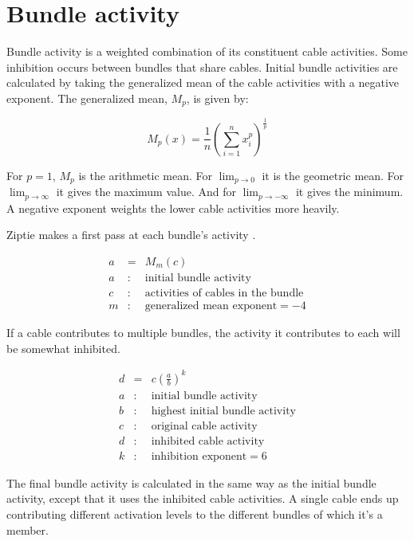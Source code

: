 \documentclass[oneside,twocolumn]{article}
\begin{document}
\section*{\color{copper} Bundle activity}

Bundle activity is a weighted combination of its constituent cable activities. Some inhibition occurs between bundles that share cables. Initial bundle activities are calculated by taking the generalized mean of the cable activities with a negative exponent.  
The generalized mean, $M_p$, is given by:

\begin{equation*}
M_p(x) = {\frac{1}{n}\left( \sum_{i=1}^{n}x_i^p  \right)}^{\frac{1}{p}} 
\end{equation*}

For $p = 1$, $M_p$ is the arithmetic mean. For $\lim_{p \to 0}$ it is the geometric mean. For $\lim_{p \to \infty}$ it gives the maximum value. And for   $\lim_{p \to -\infty}$ it gives the minimum. A negative exponent weights the lower cable activities more heavily. 

Ziptie makes a first pass at each bundle's activity .

\begin{eqnarray*}
a &=& M_m(c)\\ 
a &:& \mbox{initial bundle activity}\\ 
c &:& \mbox{activities of cables in the bundle}\\
m &:& \mbox{generalized mean exponent} = -4
\end{eqnarray*}

If a cable contributes to multiple bundles, the activity it contributes to each will be somewhat inhibited.

\begin{eqnarray*}
d &=& c \left( \frac{a}{b} \right) ^ k\\ 
a &:& \mbox{initial bundle activity}\\ 
b &:& \mbox{highest initial bundle activity}\\ 
c &:& \mbox{original cable activity}\\
d &:& \mbox{inhibited cable activity}\\
k &:& \mbox{inhibition exponent} = 6
\end{eqnarray*}

The final bundle activity is calculated in the same way as the initial bundle activity, except that it uses the inhibited cable activities. A single cable ends up contributing different activation levels to the different bundles of which it's a member.
\end{document}
